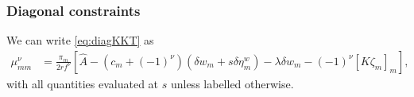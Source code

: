 \documentclass[12pt]{article}
\newcommand{\eqm}{\pi}
\newcommand{\etwm}{\eta^w}
\newcommand{\dgnm}{\zeta}
\newcommand{\wm}{w}
\newcommand{\encm}{K}
\newcommand{\kktm}{\mu}
\begin{document}

\subsubsection{Diagonal constraints}\label{sec:diagKKT}

We can write \cref{eq:diagKKT} as
%
\begin{equation*}
\begin{aligned}
  \kktm^\nu_{mm} &= \frac{\eqm_m}{2rf^\nu} 
    \left[ 
      \hat{A}
      - (c_m + (-1)^\nu) (\delta \wm_m + s \delta \etwm_m)
      - \lambda \delta w_m
      - (-1)^\nu [\encm \dgnm_m]_m
    \right],
\end{aligned}
\end{equation*}
%
with all quantities evaluated at \(s\) unless labelled otherwise.
\end{document}
